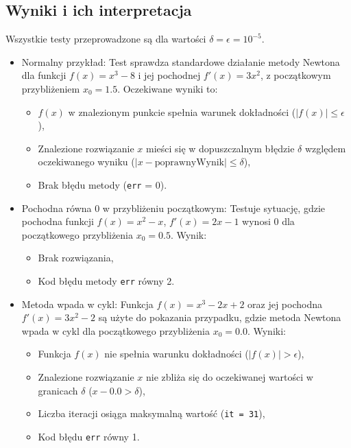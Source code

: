 \documentclass{article}
\begin{document}
\subsection{Wyniki i ich interpretacja}
Wszystkie testy przeprowadzone są dla wartości $\delta = \epsilon = 10^{-5}$.
\begin{itemize}
    \item Normalny przykład:
    Test sprawdza standardowe działanie metody Newtona dla funkcji \(f(x) = x^3 - 8\) i jej pochodnej \(f'(x) = 3x^2\), z początkowym przybliżeniem \(x_0 = 1.5\). Oczekiwane wyniki to:
    \begin{itemize}
        \item \(f(x)\) w znalezionym punkcie spełnia warunek dokładności (\(|f(x)| \leq \epsilon\)),
        \item Znalezione rozwiązanie \(x\) mieści się w dopuszczalnym błędzie \(\delta\) względem oczekiwanego wyniku (\(|x - \text{poprawnyWynik}| \leq \delta\)),
        \item Brak błędu metody (\texttt{err} = 0).
    \end{itemize}
    
    \item Pochodna równa 0 w przybliżeniu początkowym:
    Testuje sytuację, gdzie pochodna funkcji \(f(x) = x^2 - x\), \(f'(x) = 2x - 1\) wynosi 0 dla początkowego przybliżenia \(x_0 = 0.5\). Wynik:
    \begin{itemize}
        \item Brak rozwiązania,
        \item Kod błędu metody \texttt{err} równy 2.
    \end{itemize}
    
    \item Metoda wpada w cykl:
    Funkcja \(f(x) = x^3 - 2x + 2\) oraz jej pochodna \(f'(x) = 3x^2 - 2\) są użyte do pokazania przypadku, gdzie metoda Newtona wpada w cykl dla początkowego przybliżenia \(x_0 = 0.0\). Wyniki:
    \begin{itemize}
        \item Funkcja \(f(x)\) nie spełnia warunku dokładności (\(|f(x)| > \epsilon\)),
        \item Znalezione rozwiązanie \(x\) nie zbliża się do oczekiwanej wartości w granicach \(\delta\) ($x - 0.0 > \delta$),
        \item Liczba iteracji osiąga maksymalną wartość (\texttt{it = 31}),
        \item Kod błędu \texttt{err} równy 1.
    \end{itemize}
\end{itemize}
\end{document}
